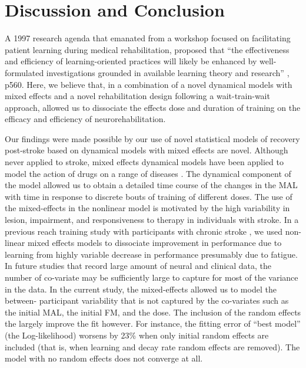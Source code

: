 \section{Discussion and Conclusion}
A 1997 research agenda that emanated from a workshop focused on facilitating patient learning during medical rehabilitation, proposed that “the effectiveness and efficiency of learning-oriented practices will likely be enhanced by well-formulated investigations grounded in available learning theory and research” \cite{Fuhrer1998}, p560. 
Here, we believe that, in a combination of a novel dynamical models with mixed effects and a novel rehabilitation design following a wait-train-wait approach, allowed us to dissociate the effects dose and duration of training on the efficacy and efficiency of neurorehabilitation.

Our findings were made possible by our use of novel statistical models of recovery post-stroke based on dynamical models with mixed effects are novel.
Although never applied to stroke, mixed effects dynamical models have been applied to model the action of drugs on a range of diseases \cite{Cazelles1997, Tan2000}.  
The dynamical component of the model allowed us to obtain a detailed time course of the changes in the MAL with time in response to discrete bouts of training of different doses. 
The use of the mixed-effects in the nonlinear model is motivated by the high variability in lesion, impairment, and responsiveness to therapy in individuals with stroke. 
In a previous reach training study with participants with chronic stroke \cite{Park2017}, we used non-linear mixed effects models to dissociate improvement in performance due to learning from highly variable decrease in performance presumably due to fatigue. 
In future studies that record large amount of neural and clinical data, the number of co-variate may be sufficiently large to capture for most of the variance in the data. 
In the current study, the mixed-effects allowed us to model the between- participant variability that is not captured by the co-variates such as the initial MAL, the initial FM, and the dose. 
The inclusion of the random effects the largely improve the fit however. 
For instance, the fitting error of  “best model” (the Log-likelihood) worsens by 23\% when only initial random effects are included (that is, when learning and decay rate random effects are removed). 
The model with no random effects does not converge at all. 

